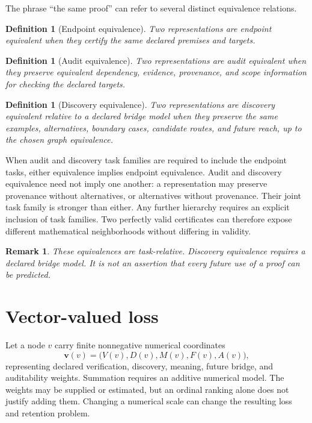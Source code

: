 \documentclass[11pt,oneside]{article}
\theoremstyle{komorebiplain}
\theoremstyle{komorebidefinition}
\newtheorem{definition}[theorem]{Definition}
\theoremstyle{komorebiremark}
\newtheorem{remark}[theorem]{Remark}
\begin{document}
The phrase ``the same proof'' can refer to several distinct equivalence relations.

\begin{definition}[Endpoint equivalence]
\label{res:8:1}
Two representations are endpoint equivalent when they certify the same declared premises and targets.
\end{definition}

\begin{definition}[Audit equivalence]
\label{res:8:2}
Two representations are audit equivalent when they preserve equivalent dependency, evidence, provenance, and scope information for checking the declared targets.
\end{definition}

\begin{definition}[Discovery equivalence]
\label{res:8:3}
Two representations are discovery equivalent relative to a declared bridge model when they preserve the same examples, alternatives, boundary cases, candidate routes, and future reach, up to the chosen graph equivalence.
\end{definition}

When audit and discovery task families are required to include the endpoint tasks, either equivalence implies endpoint equivalence. Audit and discovery equivalence need not imply one another: a representation may preserve provenance without alternatives, or alternatives without provenance. Their joint task family is stronger than either. Any further hierarchy requires an explicit inclusion of task families. Two perfectly valid certificates can therefore expose different mathematical neighborhoods without differing in validity.

\begin{remark}
\label{res:8:4}
These equivalences are task-relative. Discovery equivalence requires a declared bridge model. It is not an assertion that every future use of a proof can be predicted.
\end{remark}


\section{Vector-valued loss}
\label{sec:old9}

Let a node $v$ carry finite nonnegative numerical coordinates
\[
\mathbf v(v)=
\bigl(V(v),D(v),M(v),F(v),A(v)\bigr),
\]
representing declared verification, discovery, meaning, future bridge, and auditability weights. Summation requires an additive numerical model. The weights may be supplied or estimated, but an ordinal ranking alone does not justify adding them. Changing a numerical scale can change the resulting loss and retention problem.
\end{document}
